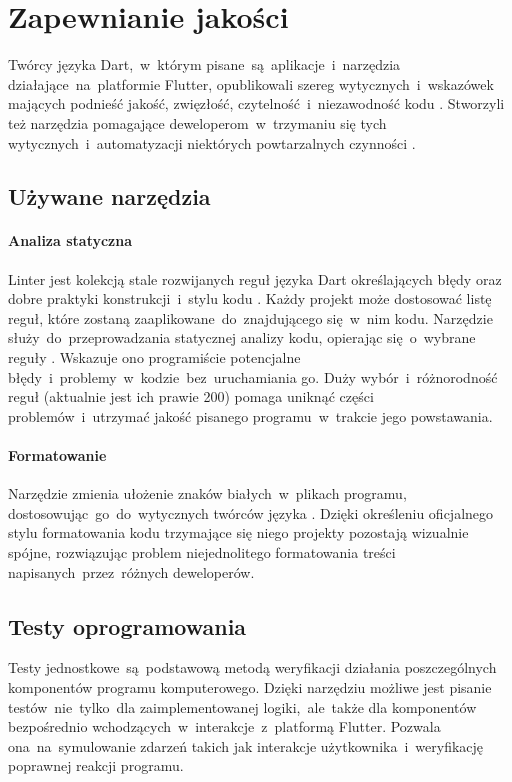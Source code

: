 \section{Zapewnianie jakości}
Twórcy języka Dart,~w~którym pisane~są~aplikacje~i~narzędzia działające~na~platformie Flutter, opublikowali szereg wytycznych~i~wskazówek mających podnieść jakość, zwięzłość, czytelność~i~niezawodność kodu \cite{Effective_Dart}. Stworzyli też narzędzia pomagające deweloperom~w~trzymaniu się tych wytycznych~i~automatyzacji niektórych powtarzalnych czynności \cite{Dart_SDK}.

\subsection{Używane narzędzia}

\paragraph{Analiza statyczna}
\label{par:static_analysis}
Linter jest kolekcją stale rozwijanych reguł języka Dart określających błędy oraz dobre praktyki konstrukcji~i~stylu kodu \cite{Dart_Lints}. Każdy projekt  może dostosować listę reguł, które zostaną zaaplikowane~do~znajdującego się~w~nim kodu. Narzędzie  służy~do~przeprowadzania statycznej analizy kodu, opierając się~o~wybrane reguły \cite{Dart_Analyze}. Wskazuje ono programiście potencjalne błędy~i~problemy~w~kodzie~bez~uruchamiania go. Duży wybór~i~różnorodność reguł (aktualnie jest ich prawie 200) pomaga uniknąć części problemów~i~utrzymać jakość pisanego programu~w~trakcie jego powstawania.

\paragraph{Formatowanie}
\label{par:dart_format}
Narzędzie  zmienia ułożenie znaków białych~w~plikach programu, dostosowując~go~do~wytycznych twórców języka \cite{Dart_Format}. Dzięki określeniu oficjalnego stylu formatowania kodu trzymające się niego projekty pozostają wizualnie spójne, rozwiązując problem niejednolitego formatowania treści napisanych~przez~różnych deweloperów.

\subsection{Testy oprogramowania}
Testy jednostkowe~są~podstawową metodą weryfikacji działania poszczególnych komponentów programu komputerowego. Dzięki narzędziu  możliwe jest pisanie testów~nie~tylko~dla zaimplementowanej logiki,~ale~także dla komponentów bezpośrednio wchodzących~w~interakcje~z~platformą Flutter. Pozwala ona~na~symulowanie zdarzeń takich jak interakcje użytkownika~i~weryfikację poprawnej reakcji programu. 
 
